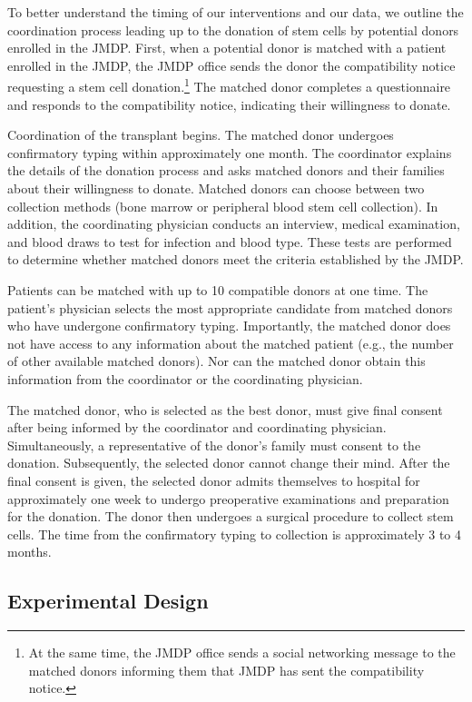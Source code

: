 \documentclass[
  11pt,
  a4paper
]{article}
\begin{document}
To better understand the timing of our interventions and our data, we outline the coordination process leading up to the donation of stem cells by potential donors enrolled in the JMDP. First, when a potential donor is matched with a patient enrolled in the JMDP, the JMDP office sends the donor the compatibility notice requesting a stem cell donation.\footnote{At the same time, the JMDP office sends a social networking message to the matched donors informing them that JMDP has sent the compatibility notice.} The matched donor completes a questionnaire and responds to the compatibility notice, indicating their willingness to donate.

Coordination of the transplant begins. The matched donor undergoes confirmatory typing within approximately one month. The coordinator explains the details of the donation process and asks matched donors and their families about their willingness to donate. Matched donors can choose between two collection methods (bone marrow or peripheral blood stem cell collection). In addition, the coordinating physician conducts an interview, medical examination, and blood draws to test for infection and blood type. These tests are performed to determine whether matched donors meet the criteria established by the JMDP.

Patients can be matched with up to 10 compatible donors at one time. The patient's physician selects the most appropriate candidate from matched donors who have undergone confirmatory typing. Importantly, the matched donor does not have access to any information about the matched patient (e.g., the number of other available matched donors). Nor can the matched donor obtain this information from the coordinator or the coordinating physician.

The matched donor, who is selected as the best donor, must give final consent after being informed by the coordinator and coordinating physician. Simultaneously, a representative of the donor's family must consent to the donation. Subsequently, the selected donor cannot change their mind. After the final consent is given, the selected donor admits themselves to hospital for approximately one week to undergo preoperative examinations and preparation for the donation. The donor then undergoes a surgical procedure to collect stem cells. The time from the confirmatory typing to collection is approximately 3 to 4 months.

\hypertarget{design}{%
\subsection{Experimental Design}\label{design}}
\end{document}
